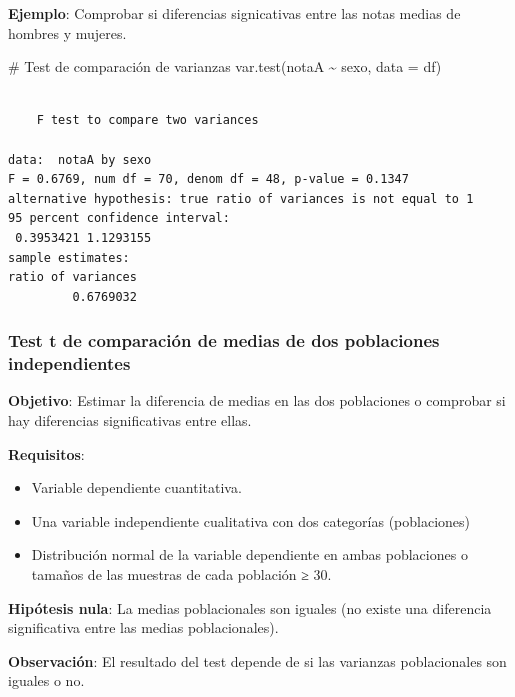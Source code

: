 \documentclass[
  a4paper,
]{scrreport}
\newenvironment{Shaded}{\begin{snugshade}}{\end{snugshade}}
\newcommand{\AttributeTok}[1]{\textcolor[rgb]{0.40,0.45,0.13}{#1}}
\newcommand{\CommentTok}[1]{\textcolor[rgb]{0.37,0.37,0.37}{#1}}
\newcommand{\FunctionTok}[1]{\textcolor[rgb]{0.28,0.35,0.67}{#1}}
\newcommand{\NormalTok}[1]{\textcolor[rgb]{0.00,0.23,0.31}{#1}}
\newcommand{\SpecialCharTok}[1]{\textcolor[rgb]{0.37,0.37,0.37}{#1}}
\providecommand{\tightlist}{%
  \setlength{\itemsep}{0pt}\setlength{\parskip}{0pt}}\usepackage{longtable,booktabs,array}
\theoremstyle{definition}
\theoremstyle{definition}
\theoremstyle{remark}
\begin{document}
\textbf{Ejemplo}: Comprobar si diferencias signicativas entre las notas
medias de hombres y mujeres.

\begin{Shaded}
\begin{Highlighting}[]
\CommentTok{\# Test de comparación de varianzas}
\FunctionTok{var.test}\NormalTok{(notaA }\SpecialCharTok{\textasciitilde{}}\NormalTok{ sexo, }\AttributeTok{data =}\NormalTok{ df)}
\end{Highlighting}
\end{Shaded}

\begin{verbatim}

    F test to compare two variances

data:  notaA by sexo
F = 0.6769, num df = 70, denom df = 48, p-value = 0.1347
alternative hypothesis: true ratio of variances is not equal to 1
95 percent confidence interval:
 0.3953421 1.1293155
sample estimates:
ratio of variances 
         0.6769032 
\end{verbatim}

\hypertarget{test-t-de-comparaciuxf3n-de-medias-de-dos-poblaciones-independientes}{%
\subsubsection{Test t de comparación de medias de dos poblaciones
independientes}\label{test-t-de-comparaciuxf3n-de-medias-de-dos-poblaciones-independientes}}

\textbf{Objetivo}: Estimar la diferencia de medias en las dos
poblaciones o comprobar si hay diferencias significativas entre ellas.

\textbf{Requisitos}:

\begin{itemize}
\tightlist
\item
  Variable dependiente cuantitativa.
\item
  Una variable independiente cualitativa con dos categorías
  (poblaciones)
\item
  Distribución normal de la variable dependiente en ambas poblaciones o
  tamaños de las muestras de cada población ≥ 30.
\end{itemize}

\textbf{Hipótesis nula}: La medias poblacionales son iguales (no existe
una diferencia significativa entre las medias poblacionales).

\textbf{Observación}: El resultado del test depende de si las varianzas
poblacionales son iguales o no.
\end{document}
